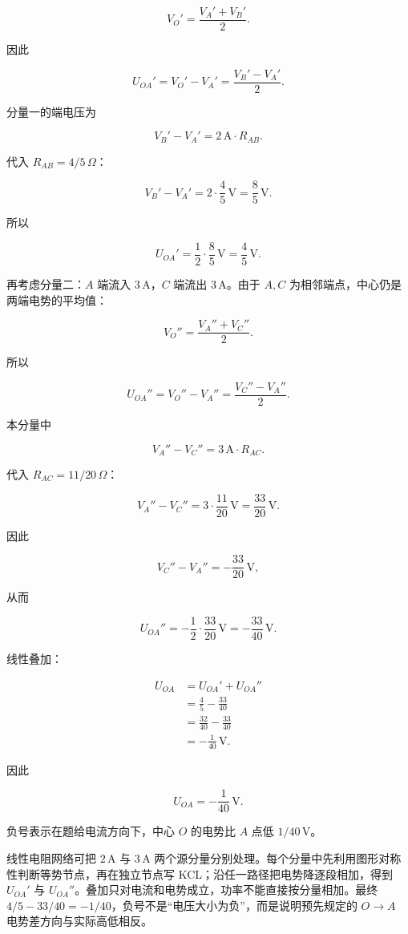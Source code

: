 \documentclass[12pt,a4paper,UTF8]{ctexart}
\begin{document}
\[V_O'=\frac{V_A'+V_B'}{2}.\]

因此

\[U_{OA}'=V_O'-V_A'
=\frac{V_B'-V_A'}{2}.\]

分量一的端电压为

\[V_B'-V_A'
=2\,\mathrm A\cdot R_{AB}.\]

代入 \(R_{AB}=4/5\,\Omega\)：

\[V_B'-V_A'
=2\cdot\frac45\,\mathrm V
=\frac85\,\mathrm V.\]

所以

\[U_{OA}'=\frac12\cdot\frac85\,\mathrm V
=\frac45\,\mathrm V.\]

再考虑分量二：\(A\) 端流入 \(3\,\mathrm A\)，\(C\) 端流出
\(3\,\mathrm A\)。由于 \(A,C\) 为相邻端点，中心仍是两端电势的平均值：

\[V_O''=\frac{V_A''+V_C''}{2}.\]

所以

\[U_{OA}''
=V_O''-V_A''
=\frac{V_C''-V_A''}{2}.\]

本分量中

\[V_A''-V_C''
=3\,\mathrm A\cdot R_{AC}.\]

代入 \(R_{AC}=11/20\,\Omega\)：

\[V_A''-V_C''
=3\cdot\frac{11}{20}\,\mathrm V
=\frac{33}{20}\,\mathrm V.\]

因此

\[V_C''-V_A''=-\frac{33}{20}\,\mathrm V,\]

从而

\[U_{OA}''
=-\frac12\cdot\frac{33}{20}\,\mathrm V
=-\frac{33}{40}\,\mathrm V.\]

线性叠加：

\[\begin{aligned}
U_{OA}
&=U_{OA}'+U_{OA}''\\
&=\frac45-\frac{33}{40}\\
&=\frac{32}{40}-\frac{33}{40}\\
&=-\frac1{40}\,\mathrm V.
\end{aligned}\]

因此

\[\boxed{U_{OA}=-\frac1{40}\,\mathrm V}.\]

负号表示在题给电流方向下，中心 \(O\) 的电势比 \(A\) 点低
\(1/40\,\mathrm V\)。

线性电阻网络可把 \(2\,\mathrm A\) 与 \(3\,\mathrm A\)
两个源分量分别处理。每个分量中先利用图形对称性判断等势节点，再在独立节点写
KCL；沿任一路径把电势降逐段相加，得到 \(U_{OA}'\) 与
\(U_{OA}''\)。叠加只对电流和电势成立，功率不能直接按分量相加。最终
\(4/5-33/40=-1/40\)，负号不是``电压大小为负''，而是说明预先规定的
\(O\to A\) 电势差方向与实际高低相反。
\end{document}
